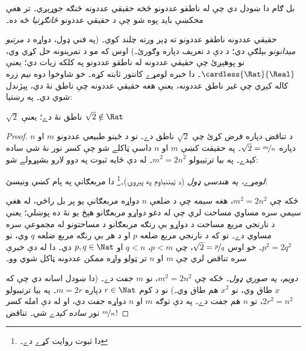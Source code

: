 \documentclass[../../../include/open-logic-section]{subfiles}
\begin{document}

بل ګام دا ښودل دي چې له ناطقو عددونو څخه حقيقي عددونه څنګه
جوړېږي۔ تر هغې مخکښې بايد پوه شو چې د حقيقي عددونو
\emph{ځانګړتيا} څه ده۔

حقيقي عددونه ناطقو عددونو ته ډېر ورته چلند کوي۔ (په فني ډول، دواړه
د \emph{مرتبو ميدانونو} بېلګې دي؛ د دې د تعريف دپاره
 وګورئ۔) اوس که مو د
 تمرينونه حل کړي وي، نو پوهېږئ چې حقيقي
عددونه له ناطقو عددونو په کلکه زيات دي؛ يعنې
$\cardless{\Rat}{\Real}$۔ دا خبره لومړے کانتور ثابته کړه۔ خو شاوخوا
دوه نيم زره کاله کېږي چې غير ناطق عددونه، يعنې هغه حقيقي عددونه چې
ناطق نۀ دي، پېژندل شوي دي۔ په رښتيا:
\begin{thm}
$\sqrt{2}$ ناطق نۀ دے؛ يعنې $\sqrt{2} \notin \Rat$
\end{thm}

\begin{proof}
د تناقض دپاره فرض کړئ چې $\sqrt{2}$ ناطق دے۔ نو د ځينو طبيعي
عددونو $m$ او $n$ دپاره $\sqrt{2} = \nicefrac{m}{n}$۔ په حقيقت
کښې $m$ او $n$ داسې ټاکلے شو چې کسر نور نۀ شي ساده کېدے۔ په بيا
ترتيبولو $m^{2} = 2n^{2}$۔ له دې ځايه ثبوت په دوو لارو بشپړولے شو:

\emph{لومړے، په هندسي ډول} (د ټېننباوم په پيروۍ)۔\footnote{دا
ثبوت \cite{Conway2006} روايت کړے دے۔} دا مربعګانې په پام کښې ونيسئ:
\begin{center}	
\end{center}
ځکه چې $m^2 = 2n^2$، هغه سيمه چې د ضلعې $n$ دواړه مربعګانې
يو پر بل راځي، له هغې سيمې سره مساوي مساحت لري چې له دغو دواړو
مربعګانو هېڅ يو نۀ ده پوښلې؛ يعنې د نارنجي مربع مساحت د دواړو
بې رنګه مربعګانو د مساحتونو له مجموعې سره مساوي دے۔ نو که د نارنجي
مربع ضلعه $p$ او د هر بې رنګه مربع ضلعه $q$ وي، نو $p^2 = 2q^2$۔
خو اوس $\sqrt{2} = \nicefrac{p}{q}$، چې $p < m$، $q < n$ او
$p, q \in \Nat$ دي۔ دا له دې خبرې سره تناقض لري چې $m$ او $n$
تر ټولو واړه ممکن عددونه ټاکل شوي وو۔
		
\emph{دويم، په صوري ډول۔} ځکه چې $m^{2} = 2n^{2}$، نو $m$ جفت
دے۔ (دا ښودل اسانه دي چې که $x$ طاق وي، نو $x^2$ هم طاق وي۔)
نو د کوم $r \in \Nat$ دپاره $m = 2r$۔ په بيا ترتيبولو
$2r^2 = n^2$،
نو $n$ هم جفت دے۔ په دې توګه $m$ او $n$ دواړه جفت دي، او له دې
امله کسر $\nicefrac{m}{n}$ نور \emph{ساده کېدے} شي۔ تناقض!
\end{proof}
\end{document}
